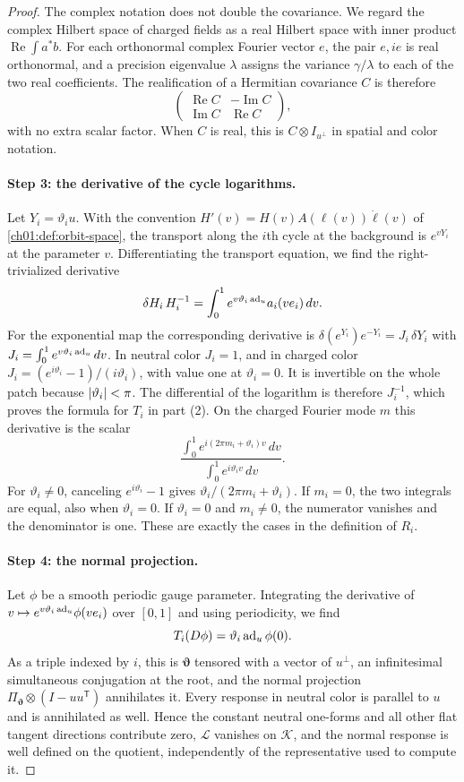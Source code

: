 \begin{proof}
The complex notation does not double the covariance. We regard the complex Hilbert space of charged fields as a real Hilbert space with inner product $\operatorname{Re}\int a^*b$. For each orthonormal complex Fourier vector $e$, the pair $e,ie$ is real orthonormal, and a precision eigenvalue $\lambda$ assigns the variance $\gamma/\lambda$ to each of the two real coefficients. The realification of a Hermitian covariance $C$ is therefore
\[
 \begin{pmatrix}\operatorname{Re}C&-\operatorname{Im}C\\ \operatorname{Im}C&\operatorname{Re}C\end{pmatrix},
\]
with no extra scalar factor. When $C$ is real, this is $C\otimes I_{u^\perp}$ in spatial and color notation.

\paragraph{Step 3: the derivative of the cycle logarithms.}
Let $Y_i=\vartheta_iu$. With the convention $H'(v)=H(v)A(\ell(v))\dot\ell(v)$ of \cref{ch01:def:orbit-space}, the transport along the $i$th cycle at the background is $e^{vY_i}$ at the parameter $v$. Differentiating the transport equation, we find the right-trivialized derivative
\[
 \delta H_i\,H_i^{-1}=\int_0^1e^{v\vartheta_i\operatorname{ad}_u}a_i(ve_i)\,dv.
\]
For the exponential map the corresponding derivative is $\delta(e^{Y_i})e^{-Y_i}=J_i\,\delta Y_i$ with $J_i=\int_0^1e^{v\vartheta_i\operatorname{ad}_u}\,dv$. In neutral color $J_i=1$, and in charged color $J_i=(e^{i\vartheta_i}-1)/(i\vartheta_i)$, with value one at $\vartheta_i=0$. It is invertible on the whole patch because $\lvert \vartheta_i\rvert<\pi$. The differential of the logarithm is therefore $J_i^{-1}$, which proves the formula for $T_i$ in part (2). On the charged Fourier mode $m$ this derivative is the scalar
\[
 \frac{\int_0^1e^{i(2\pi m_i+\vartheta_i)v}\,dv}{\int_0^1e^{i\vartheta_iv}\,dv}.
\]
For $\vartheta_i\ne0$, canceling $e^{i\vartheta_i}-1$ gives $\vartheta_i/(2\pi m_i+\vartheta_i)$. If $m_i=0$, the two integrals are equal, also when $\vartheta_i=0$. If $\vartheta_i=0$ and $m_i\ne0$, the numerator vanishes and the denominator is one. These are exactly the cases in the definition of $R_i$.

\paragraph{Step 4: the normal projection.}
Let $\phi$ be a smooth periodic gauge parameter. Integrating the derivative of $v\mapsto e^{v\vartheta_i\operatorname{ad}_u}\phi(ve_i)$ over $[0,1]$ and using periodicity, we find
\[
 T_i(D\phi)=\vartheta_i\operatorname{ad}_u\phi(0).
\]
As a triple indexed by $i$, this is $\bm\vartheta$ tensored with a vector of $u^\perp$, an infinitesimal simultaneous conjugation at the root, and the normal projection $\Pi_{\bm\vartheta}\otimes(I-uu^{\mathsf T})$ annihilates it. Every response in neutral color is parallel to $u$ and is annihilated as well. Hence the constant neutral one-forms and all other flat tangent directions contribute zero, $\mathcal L$ vanishes on $\mathcal K$, and the normal response is well defined on the quotient, independently of the representative used to compute it.


\end{proof}
